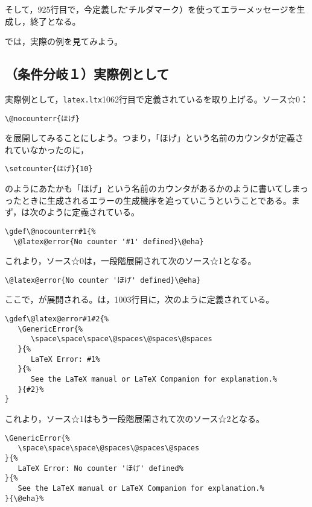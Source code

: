 \documentclass[autodetect-engine,dvipdfmx]{jsarticle}
\begin{document}
そして，925行目で，今定義した\~（チルダマーク）を使ってエラーメッセージを生成し，終了となる。

では，実際の例を見てみよう。


\subsection{（条件分岐１）実際例として}

実際例として，\texttt{latex.ltx}1062行目で定義されているを取り上げる。ソース☆0：
\texsource
\begin{lstlisting}
\@nocounterr{ほげ}
\end{lstlisting}
を展開してみることにしよう。つまり，「ほげ」という名前のカウンタが定義されていなかったのに，
\texsource
\begin{lstlisting}
\setcounter{ほげ}{10}
\end{lstlisting}
のようにあたかも「ほげ」という名前のカウンタがあるかのように書いてしまっったときに生成されるエラーの生成機序を追っていこうということである。まず，は次のように定義されている。

\latexltx
\begin{lstlisting}[firstnumber=1062]
\gdef\@nocounterr#1{%
  \@latex@error{No counter '#1' defined}\@eha}
\end{lstlisting}

これより，ソース☆0は，一段階展開されて次のソース☆1となる。
\texsource
\begin{lstlisting}
\@latex@error{No counter 'ほげ' defined}\@eha}
\end{lstlisting}

ここで，が展開される。は，1003行目に，次のように定義されている。

\latexltx
\begin{lstlisting}[firstnumber=1003]
\gdef\@latex@error#1#2{%
   \GenericError{%
      \space\space\space\@spaces\@spaces\@spaces
   }{%
      LaTeX Error: #1%
   }{%
      See the LaTeX manual or LaTeX Companion for explanation.%
   }{#2}%
}
\end{lstlisting}

これより，ソース☆1はもう一段階展開されて次のソース☆2となる。
\texsource
\begin{lstlisting}
\GenericError{%
   \space\space\space\@spaces\@spaces\@spaces
}{%
   LaTeX Error: No counter 'ほげ' defined%
}{%
   See the LaTeX manual or LaTeX Companion for explanation.%
}{\@eha}%
\end{lstlisting}
\end{document}
